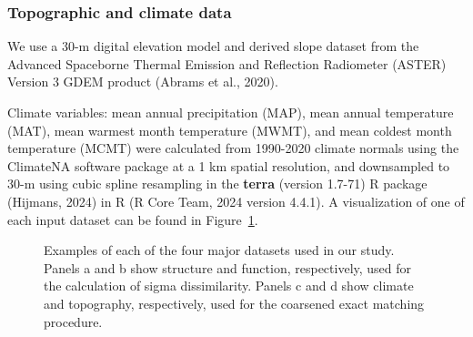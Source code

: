 \documentclass[
]{agujournal2019}
\begin{document}
\subsubsection{Topographic and climate
data}\label{topographic-and-climate-data}

We use a 30-m digital elevation model and derived slope dataset from the
Advanced Spaceborne Thermal Emission and Reflection Radiometer (ASTER)
Version 3 GDEM product (Abrams et al., 2020).

Climate variables: mean annual precipitation (MAP), mean annual
temperature (MAT), mean warmest month temperature (MWMT), and mean
coldest month temperature (MCMT) were calculated from 1990-2020 climate
normals using the ClimateNA software package at a 1 km spatial
resolution, and downsampled to 30-m using cubic spline resampling in the
\textbf{terra} (version 1.7-71) R package (Hijmans, 2024) in R (R Core
Team, 2024 version 4.4.1). A visualization of one of each input dataset
can be found in Figure~\ref{fig-data}.

\label{cell-fig-data}
\begin{figure}[H]


\caption{\label{fig-data}Examples of each of the four major datasets
used in our study. Panels a and b show structure and function,
respectively, used for the calculation of sigma dissimilarity. Panels c
and d show climate and topography, respectively, used for the coarsened
exact matching procedure.}

\end{figure}%
\end{document}
